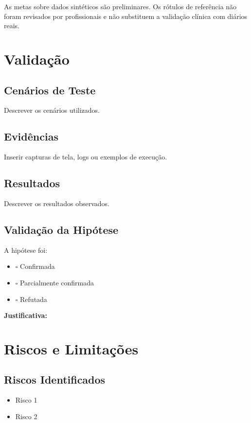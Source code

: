 \documentclass[12pt,a4paper]{article}
\begin{document}
As metas sobre dados sintéticos são preliminares. Os rótulos de referência não foram revisados
por profissionais e não substituem a validação clínica com diários reais.

\section{Validação}

\subsection{Cenários de Teste}
Descrever os cenários utilizados.

\subsection{Evidências}
Inserir capturas de tela, logs ou exemplos de execução.

\subsection{Resultados}
Descrever os resultados observados.

\subsection{Validação da Hipótese}
A hipótese foi:
\begin{itemize}[label={}]
  \item $\square$ Confirmada
  \item $\square$ Parcialmente confirmada
  \item $\square$ Refutada
\end{itemize}

\textbf{Justificativa:}

\section{Riscos e Limitações}

\subsection{Riscos Identificados}
\begin{itemize}
  \item Risco 1
  \item Risco 2
\end{itemize}
\end{document}
